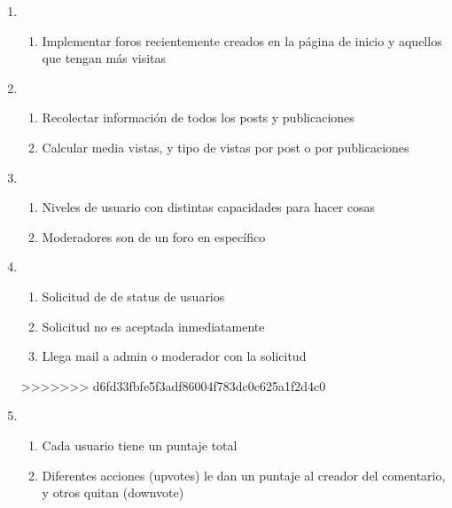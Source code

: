 \documentclass[12pt, letterpaper, notitlepage]{article}
\begin{document}
\begin{enumerate}
\begin{enumerate}
		
		\item {}
		\begin{enumerate}
			\item Implementar foros recientemente creados en la página de inicio y aquellos que tengan más visitas
		\end{enumerate}
		
		
		
		\item {}
		\begin{enumerate}
			\item Recolectar información de todos los posts y publicaciones
			\item Calcular media vistas, y tipo de vistas por post o por publicaciones
		\end{enumerate}
		
		\item {}
		\begin{enumerate}
			\item Niveles de usuario con distintas capacidades para hacer cosas
			\item Moderadores son de un foro en específico
		\end{enumerate}
		
		\item {}
		\begin{enumerate}
			\item Solicitud de  de status de usuarios
			\item Solicitud no es aceptada inmediatamente
			\item Llega mail a admin o moderador con la solicitud
		\end{enumerate}
>>>>>>> d6fd33fbfe5f3adf86004f783dc0c625a1f2d4c0
		
		\item {}
		\begin{enumerate}
			\item Cada usuario tiene un puntaje total
			\item Diferentes acciones (upvotes) le dan un puntaje al creador del comentario, y otros quitan (downvote)	
		\end{enumerate}
		

\end{enumerate}
\end{enumerate}
\end{document}
